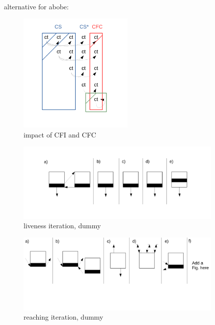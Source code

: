 alternative for abobe:
\begin{figure}[!ht]
  \caption{impact of CFI and CFC}
  \centering
    \includegraphics[width=0.5\textwidth]{figures/impact_of_cfi_and_cfc.pdf}
\end{figure}

\begin{figure}[!ht]
  \caption{liveness iteration, dummy}
  \centering
    \includegraphics[width=0.9\textwidth]{figures/liveness_iteration.pdf}
\end{figure}

\begin{figure}[!ht]
  \caption{reaching iteration, dummy}
  \centering
    \includegraphics[width=0.9\textwidth]{figures/reaching_iteration.pdf}
\end{figure}





